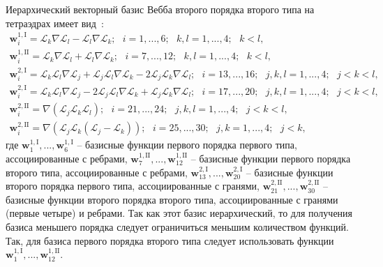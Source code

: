 \documentclass[a4paper,14pt]{article}
\begin{document}
Иерархический векторный базис Вебба второго порядка второго типа на тетраэдрах имеет вид~\citep{mikhajlova}:
\begin{equation*}
	\begin{matrix}
		\displaystyle
		\mathbf{w}_{i}^{1,\mathrm{I}} = \mathcal{L}_k \nabla \mathcal{L}_l - \mathcal{L}_l \nabla \mathcal{L}_k ;
		\scriptstyle
		\text{~~} i = 1, ..., 6 ; \text{~~} k, l = 1, ..., 4 ; \text{~~} k < l ,\\
		\displaystyle
		\mathbf{w}_{i}^{1,\mathrm{II}} = \mathcal{L}_k \nabla \mathcal{L}_l + \mathcal{L}_l \nabla \mathcal{L}_k ;
		\scriptstyle
		\text{~~} i = 7, ..., 12 ; \text{~~} k, l = 1, ..., 4 ; \text{~~} k < l ,\\
		\displaystyle
		\mathbf{w}_{i}^{2,\mathrm{I}} = \mathcal{L}_k \mathcal{L}_l \nabla \mathcal{L}_j + \mathcal{L}_j \mathcal{L}_l \nabla \mathcal{L}_k - 2 \mathcal{L}_j \mathcal{L}_k \nabla \mathcal{L}_l ;
		\scriptstyle
		\text{~~} i = 13, ..., 16 ; \text{~~} j, k, l = 1, ..., 4 ; \text{~~} j < k < l ,\\
		\displaystyle
		\mathbf{w}_{i}^{2,\mathrm{I}} = \mathcal{L}_k \mathcal{L}_l \nabla \mathcal{L}_j - 2 \mathcal{L}_j \mathcal{L}_l \nabla \mathcal{L}_k + \mathcal{L}_j \mathcal{L}_k \nabla \mathcal{L}_l ;
		\scriptstyle
		\text{~~} i = 17, ..., 20 ; \text{~~} j, k, l = 1, ..., 4 ; \text{~~} j < k < l ,\\
		\displaystyle
		\mathbf{w}_{i}^{2,\mathrm{II}} = \nabla ( \mathcal{L}_j \mathcal{L}_k \mathcal{L}_l ) ;
		\scriptstyle
		\text{~~} i = 21, ..., 24 ; \text{~~} j, k, l = 1, ..., 4 ; \text{~~} j < k < l ,\\
		\displaystyle
		\mathbf{w}_{i}^{2,\mathrm{II}} = \nabla ( \mathcal{L}_j \mathcal{L}_k ( \mathcal{L}_j - \mathcal{L}_k ) ) ;
		\scriptstyle
		\text{~~} i = 25, ..., 30 ; \text{~~} j, k = 1, ..., 4 ; \text{~~} j < k ,
	\end{matrix}
	\label{eq:basis}
\end{equation*}
где $\mathbf{w}_{1}^{1,\mathrm{I}}, ..., \mathbf{w}_{6}^{1,\mathrm{I}}$ -- базисные функции первого порядка первого типа, ассоциированные с ребрами, $\mathbf{w}_{7}^{1,\mathrm{II}}, ..., \mathbf{w}_{12}^{1,\mathrm{II}}$ -- базисные функции первого порядка второго типа, ассоциированные с ребрами, $\mathbf{w}_{13}^{2,\mathrm{I}}, ..., \mathbf{w}_{20}^{2,\mathrm{I}}$ -- базисные функции второго порядка первого типа, ассоциированные с гранями, $\mathbf{w}_{21}^{2,\mathrm{II}}, ..., \mathbf{w}_{30}^{2,\mathrm{II}}$ -- базисные функции второго порядка второго типа, ассоциированные с гранями (первые четыре) и ребрами. Так как этот базис иерархический, то для получения базиса меньшего порядка следует ограничиться меньшим количеством функций. Так, для базиса первого порядка второго  типа следует использовать функции $\mathbf{w}_{1}^{1,\mathrm{I}}, ..., \mathbf{w}_{12}^{1,\mathrm{II}}$.
\end{document}
